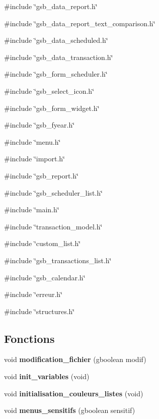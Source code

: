 {\ttfamily \#include \char`\"{}gsb\_\-data\_\-report.h\char`\"{}}\par
{\ttfamily \#include \char`\"{}gsb\_\-data\_\-report\_\-text\_\-comparison.h\char`\"{}}\par
{\ttfamily \#include \char`\"{}gsb\_\-data\_\-scheduled.h\char`\"{}}\par
{\ttfamily \#include \char`\"{}gsb\_\-data\_\-transaction.h\char`\"{}}\par
{\ttfamily \#include \char`\"{}gsb\_\-form\_\-scheduler.h\char`\"{}}\par
{\ttfamily \#include \char`\"{}gsb\_\-select\_\-icon.h\char`\"{}}\par
{\ttfamily \#include \char`\"{}gsb\_\-form\_\-widget.h\char`\"{}}\par
{\ttfamily \#include \char`\"{}gsb\_\-fyear.h\char`\"{}}\par
{\ttfamily \#include \char`\"{}menu.h\char`\"{}}\par
{\ttfamily \#include \char`\"{}import.h\char`\"{}}\par
{\ttfamily \#include \char`\"{}gsb\_\-report.h\char`\"{}}\par
{\ttfamily \#include \char`\"{}gsb\_\-scheduler\_\-list.h\char`\"{}}\par
{\ttfamily \#include \char`\"{}main.h\char`\"{}}\par
{\ttfamily \#include \char`\"{}transaction\_\-model.h\char`\"{}}\par
{\ttfamily \#include \char`\"{}custom\_\-list.h\char`\"{}}\par
{\ttfamily \#include \char`\"{}gsb\_\-transactions\_\-list.h\char`\"{}}\par
{\ttfamily \#include \char`\"{}gsb\_\-calendar.h\char`\"{}}\par
{\ttfamily \#include \char`\"{}erreur.h\char`\"{}}\par
{\ttfamily \#include \char`\"{}structures.h\char`\"{}}\par
\subsection*{Fonctions}
\begin{DoxyCompactItemize}
\item 
void {\bf modification\_\-fichier} (gboolean modif)
\item 
void {\bf init\_\-variables} (void)
\item 
void {\bf initialisation\_\-couleurs\_\-listes} (void)
\item 
void {\bf menus\_\-sensitifs} (gboolean sensitif)
\end{DoxyCompactItemize}
